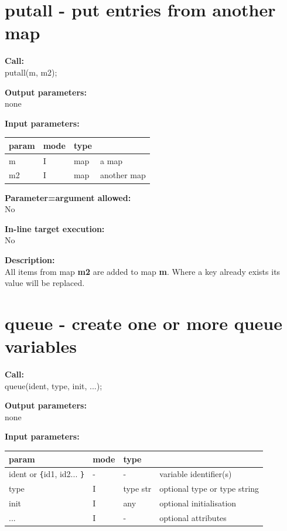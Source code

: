     \section{putall - put entries from another map}\label{sec:ipputall}
        
        {\bf Call:} \\
        putall(m, m2);
        
        {\bf Output parameters:} \\
        none
        
        {\bf Input parameters:} \\
        \begin{tabular}{| l | l | l | l |}
        \hline
        param  & mode & type & \\
        \hline \hline
        m      & I     & map  & a map   \\ \hline
        m2     & I     & map  & another map   \\ \hline
        \end{tabular}
        
        {\bf Parameter=argument allowed:} \\
        No
        
        {\bf In-line target execution:} \\
        No
        
        {\bf Description:} \\
        All items from map {\bf m2} are added to map {\bf m}. Where a
        key already exists its value will be replaced.



 

    \section{queue - create one or more queue variables}\label{sec:ipqueue}
        
        {\bf Call:} \\
        queue(ident, type, init, ...);
        
        {\bf Output parameters:} \\
        none
        
        {\bf Input parameters:} \\
        \begin{tabular}{| l | l | l | l |}
        \hline
        param  & mode & type & \\
        \hline \hline
        ident or \verb'{'id1, id2... \verb'}' & - &  -       & variable identifier(s)       \\ \hline
        type                   & I & type str & optional type or type string \\ \hline
        init                   & I & any      & optional initialisation      \\ \hline
        ...                    & I &  -       & optional attributes          \\ \hline
        \end{tabular}
        
